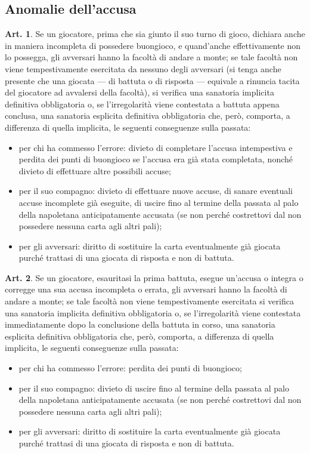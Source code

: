 \documentclass[italian,a4paper]{book}
\theoremstyle{definition}
\newtheorem{art}{Art.}
\newenvironment{packeditem}{
\begin{itemize}
  \setlength{\itemsep}{1pt}
  \setlength{\parskip}{0pt}
  \setlength{\parsep}{0pt}
}{\end{itemize}}
\begin{document}
\subsection{Anomalie dell'accusa}
\begin{art}
Se un giocatore, prima che sia giunto il suo turno di gioco, dichiara anche
in maniera incompleta di possedere buongioco, e quand'anche effettivamente
non lo possegga, gli avversari hanno la facoltà di andare a monte; se tale
facoltà non viene tempestivamente esercitata da nessuno degli avversari (si
tenga anche presente che una giocata --- di battuta o di risposta --- equivale a rinuncia tacita del giocatore ad avvalersi della facoltà), si verifica una sanatoria implicita definitiva obbligatoria o, se l'irregolarità viene contestata a battuta appena conclusa, una sanatoria esplicita definitiva obbligatoria che, però, comporta, a differenza di quella implicita, le seguenti conseguenze sulla passata:
\begin{packeditem}
\item    per chi ha commesso l'errore: divieto di completare l'accusa intempestiva e perdita dei punti di buongioco se l'accusa era già stata completata, nonché divieto di effettuare altre possibili accuse;
\item    per il suo compagno: divieto di effettuare nuove accuse, di sanare eventuali accuse incomplete già eseguite, di uscire fino al termine della passata al palo della napoletana anticipatamente accusata (se non perché costrettovi dal non possedere nessuna carta agli altri pali);
\item     per gli avversari: diritto di sostituire la carta eventualmente già giocata purché trattasi di una giocata di risposta e non di battuta.
    \end{packeditem}
\end{art}
\begin{art}
Se un giocatore, esauritasi la prima battuta, esegue un'accusa o integra o corregge una sua accusa incompleta o errata, gli avversari hanno la facoltà di andare a monte; se tale facoltà non viene tempestivamente esercitata si verifica una sanatoria implicita definitiva obbligatoria o, se l'irregolarità viene contestata immediatamente dopo la conclusione della battuta in corso, una sanatoria esplicita definitiva obbligatoria che, però, comporta, a differenza di quella implicita, le seguenti conseguenze sulla passata:
\begin{packeditem}
\item    per chi ha commesso l'errore: perdita dei punti di buongioco;
\item    per il suo compagno: divieto di uscire fino al termine della passata al palo della napoletana anticipatamente accusata (se non perché costrettovi dal non possedere nessuna carta agli altri pali);
\item     per gli avversari: diritto di sostituire la carta eventualmente già giocata purché trattasi di una giocata di risposta e non di battuta.
    \end{packeditem}
\end{art}
\end{document}
